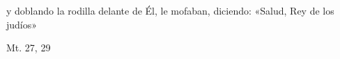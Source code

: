 \documentclass[../../rosario.tex]{subfiles}
\begin{document}
    y doblando la rodilla delante de Él, le mofaban, diciendo: «Salud, Rey de los judíos»
    \begin{flushright}
    Mt. 27, 29
    \end{flushright}
\end{document}
